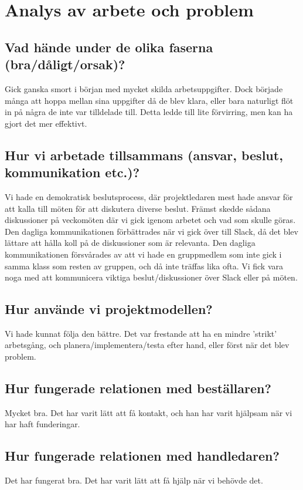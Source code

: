 \documentclass[a4paper,11pt]{article}
\begin{document}
\section{Analys av arbete och problem}
\subsection{Vad hände under de olika faserna (bra/dåligt/orsak)?}
Gick ganska smort i början med mycket skilda arbetsuppgifter. Dock började många att hoppa mellan sina uppgifter då de blev klara, eller bara naturligt flöt in på några de inte var tilldelade till. Detta ledde till lite förvirring, men kan ha gjort det mer effektivt.

\subsection{Hur vi arbetade tillsammans (ansvar, beslut, kommunikation etc.)?}
Vi hade en demokratisk beslutsprocess, där projektledaren mest hade  ansvar för att kalla till möten för att diskutera diverse beslut. Främst skedde sådana diskussioner på veckomöten där vi gick igenom arbetet och vad som skulle göras.
Den dagliga kommunikationen förbättrades när vi gick över till Slack, då det blev lättare att hålla koll på de diskussioner som är relevanta. Den dagliga kommunikationen försvårades av att vi hade en gruppmedlem som inte gick i samma klass som resten av gruppen, och då inte träffas lika ofta. Vi fick vara noga med att kommunicera viktiga beslut/diskussioner över Slack eller på möten.

\subsection{Hur använde vi projektmodellen?}
Vi hade kunnat följa den bättre. Det var frestande att ha en mindre 'strikt' arbetsgång, och planera/implementera/testa efter hand, eller först när det blev problem.

\subsection{Hur fungerade relationen med beställaren?}
Mycket bra. Det har varit lätt att få kontakt, och han har varit hjälpsam när vi har haft funderingar.

\subsection{Hur fungerade relationen med handledaren?}
Det har fungerat bra. Det har varit lätt att få hjälp när vi behövde det.
\end{document}
